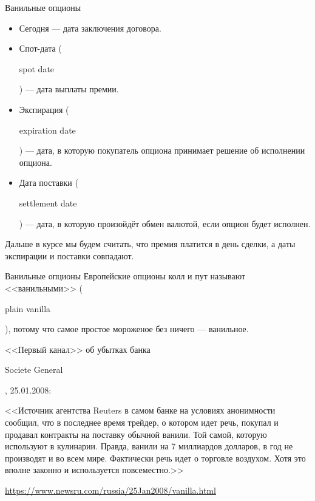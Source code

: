 \documentclass{beamer}
\newcommand{\en}[1]{\begin{otherlanguage}{english}#1\end{otherlanguage}}
\begin{document}
\begin{frame}{Ванильные опционы}
\justify
\centering
{}
	
\justify
\begin{itemize}
\justifying
\item Сегодня --- дата заключения договора.
\item Спот-дата (\en{spot date}) --- дата выплаты премии.
\item Экспирация (\en{expiration date}) --- дата, в которую покупатель опциона принимает решение об исполнении опциона.
\item Дата поставки (\en{settlement date}) --- дата, в которую произойдёт обмен валютой, если опцион будет исполнен.
\end{itemize}

\justify
Дальше в курсе мы будем считать, что премия платится в день сделки, а даты экспирации и поставки совпадают.
\end{frame}



\begin{frame}{Ванильные опционы}
\justify
Европейские опционы колл и пут называют <<\alert{ванильными}>> (\en{plain vanilla}), потому что самое простое мороженое без ничего --- ванильное.

\justify
<<Первый канал>> об убытках банка \en{Societe General}, 25.01.2008:

\justify
<<Источник агентства Reuters в самом банке на условиях анонимности сообщил, что в последнее время трейдер, о котором идет речь, покупал и продавал контракты на поставку обычной ванили. \alert{Той самой, которую используют в кулинарии}. Правда, ванили на 7 миллиардов долларов, в год не производят и во всем мире. Фактически речь идет о торговле воздухом. Хотя это вполне законно и используется повсеместно.>>

\justify
\url{https://www.newsru.com/russia/25Jan2008/vanilla.html}
\end{frame}
\end{document}
